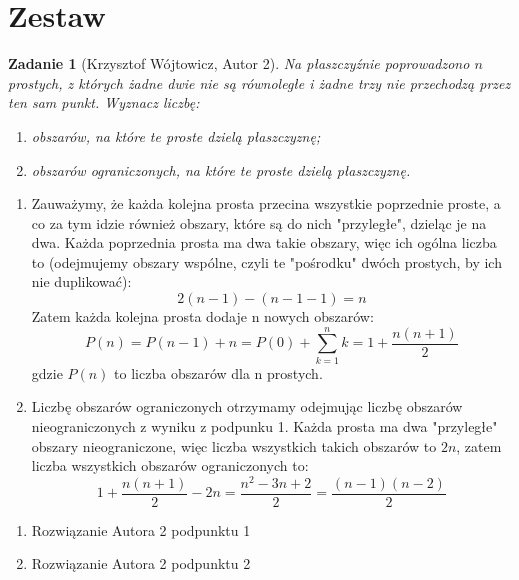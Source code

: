\documentclass{mwart}
\newtheorem{zad}{Zadanie}[section]
\begin{document}
\section{Zestaw}              %
\begin{zad}[Krzysztof Wójtowicz, Autor 2]
    Na płaszczyźnie poprowadzono $n$ prostych, z których żadne dwie nie
    są równoległe i żadne trzy nie przechodzą przez ten sam punkt.
    Wyznacz liczbę:
    \begin{enumerate}
        \item obszarów, na które te proste dzielą płaszczyznę;
        \item obszarów ograniczonych, na które te proste dzielą płaszczyznę.
    \end{enumerate}
\end{zad}
\begin{mdframed}
    \begin{enumerate}
        \item Zauważymy, że każda kolejna prosta przecina wszystkie poprzednie proste, 
        a co za tym idzie również obszary, które są do nich "przyległe", dzieląc je na 
        dwa. Każda poprzednia prosta ma dwa takie obszary, więc ich ogólna liczba to 
        (odejmujemy obszary wspólne, czyli te "pośrodku" dwóch prostych, by ich nie duplikować): 
        \[2(n-1) - (n-1-1) = n\] Zatem każda kolejna prosta dodaje n nowych obszarów: 
        \[P(n) = P(n-1) + n = P(0) + \sum_{k=1}^{n} k = 1 + \frac{n(n+1)}{2}\]
        gdzie $P(n)$ to liczba obszarów dla n prostych.
        \newline
        \item Liczbę obszarów ograniczonych otrzymamy odejmując liczbę obszarów nieograniczonych z wyniku z podpunku 1.
        Każda prosta ma dwa "przyległe" obszary nieograniczone, więc liczba wszystkich takich obszarów to $2n$,
        zatem liczba wszystkich obszarów ograniczonych to:
        \[1 + \frac{n(n+1)}{2} - 2n = \frac{n^2 - 3n + 2}{2} = \frac{(n-1)(n-2)}{2}\]
    \end{enumerate}
\end{mdframed}
\begin{mdframed}
    \begin{enumerate}
        \item Rozwiązanie Autora 2 podpunktu 1
        \item Rozwiązanie Autora 2 podpunktu 2
    \end{enumerate}
\end{mdframed}
\end{document}
